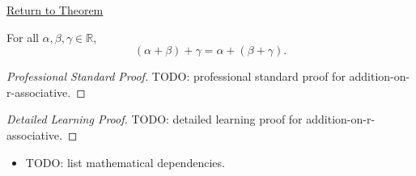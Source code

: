 \newpage
{}
\label{prf:addition-on-r-associative}

\begin{remark*}[Return]
\hyperref[thm:addition-on-r-associative]{Return to Theorem}
\end{remark*}

\begin{theorem*}
For all $\alpha,\beta,\gamma\in\mathbb{R}$,
\[
(\alpha+\beta)+\gamma=\alpha+(\beta+\gamma).
\]
\end{theorem*}

\begin{proof}[Professional Standard Proof]
\LRAProofBodyStart
TODO: professional standard proof for addition-on-r-associative.
\end{proof}

\begin{proof}[Detailed Learning Proof]
\LRAProofBodyStart
TODO: detailed learning proof for addition-on-r-associative.
\end{proof}

\begin{remark*}
\end{remark*}

\begin{dependencies}
\begin{itemize}
  \item TODO: list mathematical dependencies.
\end{itemize}
\end{dependencies}

\clearpage
